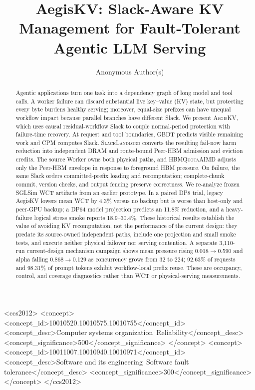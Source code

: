 \documentclass[sigplan,review,anonymous]{acmart}
\newcommand{\system}{\textsc{AegisKV}}
\begin{document}
\title{AegisKV: Slack-Aware KV Management for Fault-Tolerant Agentic LLM Serving}

\author{Anonymous Author(s)}

\begin{CCSXML}
<ccs2012>
 <concept>
  <concept_id>10010520.10010575.10010755</concept_id>
  <concept_desc>Computer systems organization~Reliability</concept_desc>
  <concept_significance>500</concept_significance>
 </concept>
 <concept>
  <concept_id>10011007.10010940.10010971</concept_id>
  <concept_desc>Software and its engineering~Software fault tolerance</concept_desc>
  <concept_significance>300</concept_significance>
 </concept>
</ccs2012>
\end{CCSXML}

\begin{abstract}
Agentic applications turn one task into a dependency graph of long model and
tool calls.  A worker failure can discard substantial live key--value (KV)
state, but protecting every byte burdens healthy serving; moreover, equal-size
prefixes can have unequal workflow impact because parallel branches have
different Slack.  We present \system{}, which uses causal residual-workflow
Slack to couple normal-period protection with failure-time recovery.  At
request and tool boundaries, GBDT predicts visible remaining work and CPM
computes Slack.  \textsc{SlackLandlord} converts the resulting fail-now harm
reduction into independent DRAM and route-bound Peer-HBM admission and
eviction credits.  The source Worker owns both physical paths, and
\textsc{HBMQuotaAIMD} adjusts only the Peer-HBM envelope in response to
foreground HBM pressure.  On failure, the same Slack orders committed-prefix
loading and recomputation; complete-chunk commit, version checks, and output
fencing preserve correctness.  We re-analyze frozen SGLSim WCT artifacts from
an earlier prototype.  In a paired DP8 trial, legacy AegisKV lowers mean WCT
by 4.3\% versus no backup but is worse than host-only and peer-GPU backup; a
DP64 model projection predicts an 11.8\% reduction, and a heavy-failure
logical stress smoke reports 18.9--30.4\%.  These historical results
establish the value of avoiding KV recomputation, not the performance of the
current design: they predate its source-owned independent paths, include one
projection and small smoke tests, and execute neither physical failover nor
serving contention.  A separate 3,110-run current-design mechanism campaign
shows mean pressure rising 0.018$\rightarrow$0.590 and alpha falling
0.868$\rightarrow$0.129 as concurrency grows from 32 to 224; 92.63\% of
requests and 98.31\% of prompt tokens exhibit workflow-local prefix reuse.
These are occupancy, control, and coverage diagnostics rather than WCT or
physical-serving measurements.
\end{abstract}
\end{document}

